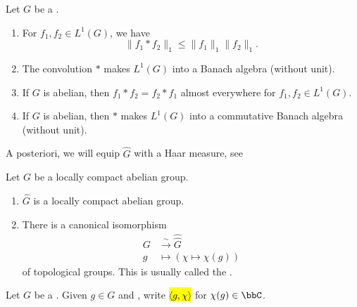 \begin{lemma}
    Let $G$ be a . 
    \begin{enumerate}
        \item For $f_1,f_2 \in L^1(G)$, we have \[ \|f_1 * f_2\|_1 \leq \|f_1\|_1 \|f_2\|_1.  \]
        \item The convolution $*$ makes $L^1(G)$ into a Banach algebra (without unit).
        \item If $G$ is abelian, then $f_1 * f_2 = f_2 * f_1$ almost everywhere for $f_1,f_2 \in L^1(G)$.
        \item If $G$ is abelian, then $*$ makes $L^1(G)$ into a commutative Banach algebra (without unit).
    \end{enumerate}
\end{lemma}






\begin{remark}
    A posteriori, we will equip $\widehat{G}$ with a Haar measure, see 
\end{remark}

\begin{lemma}
    Let \( G \) be a locally compact abelian group.
    \begin{enumerate}
        \item $\widehat{G}$ is a locally compact abelian group. 
        \item There is a canonical isomorphism 
        \begin{align*}
        G &\xrightarrow{\sim} \widehat{\widehat{G}} \\
        g &\mapsto (\chi \mapsto \chi(g))
        \end{align*}
        of topological groups. This is usually called the .
    \end{enumerate}
\end{lemma}

\begin{notation}\label{notation:bilinear_pairing_notation_for_evaluation_of_a_character}
    Let \( G \) be a . Given $g \in G$ and , write \hl{$\langle g, \chi \rangle$} for $\chi(g) \in \bbC$. 
\end{notation}


